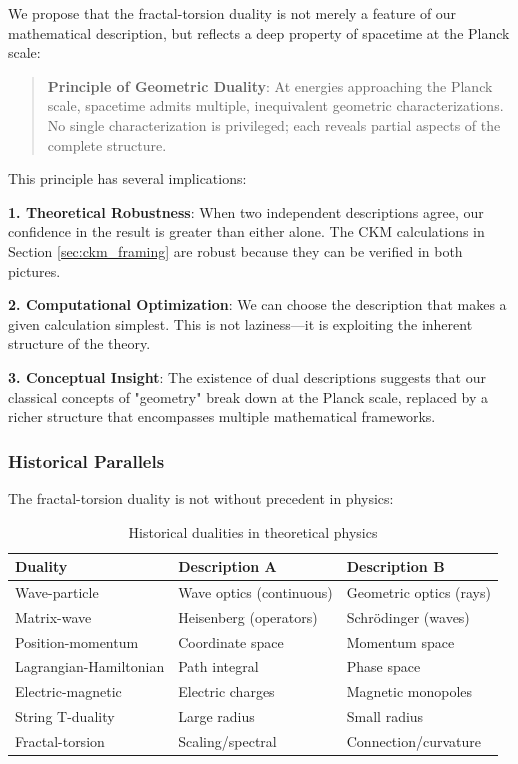 We propose that the fractal-torsion duality is not merely a feature of our mathematical description, but reflects a deep property of spacetime at the Planck scale:

\begin{quote}
\textbf{Principle of Geometric Duality}: At energies approaching the Planck scale, spacetime admits multiple, inequivalent geometric characterizations. No single characterization is privileged; each reveals partial aspects of the complete structure.
\end{quote}

This principle has several implications:

\textbf{1. Theoretical Robustness}: When two independent descriptions agree, our confidence in the result is greater than either alone. The CKM calculations in Section \ref{sec:ckm_framing} are robust because they can be verified in both pictures.

\textbf{2. Computational Optimization}: We can choose the description that makes a given calculation simplest. This is not laziness—it is exploiting the inherent structure of the theory.

\textbf{3. Conceptual Insight}: The existence of dual descriptions suggests that our classical concepts of "geometry" break down at the Planck scale, replaced by a richer structure that encompasses multiple mathematical frameworks.

\subsubsection{Historical Parallels}

The fractal-torsion duality is not without precedent in physics:

\begin{table}[h]
\centering
\begin{tabular}{p{3cm}p{4cm}p{4cm}}
\hline
\textbf{Duality} & \textbf{Description A} & \textbf{Description B} \\
\hline
Wave-particle & Wave optics (continuous) & Geometric optics (rays) \\
Matrix-wave & Heisenberg (operators) & Schrödinger (waves) \\
Position-momentum & Coordinate space & Momentum space \\
Lagrangian-Hamiltonian & Path integral & Phase space \\
Electric-magnetic & Electric charges & Magnetic monopoles \\
String T-duality & Large radius & Small radius \\
\hline
Fractal-torsion & Scaling/spectral & Connection/curvature \\
\hline
\end{tabular}
\caption{Historical dualities in theoretical physics}
\end{table}

